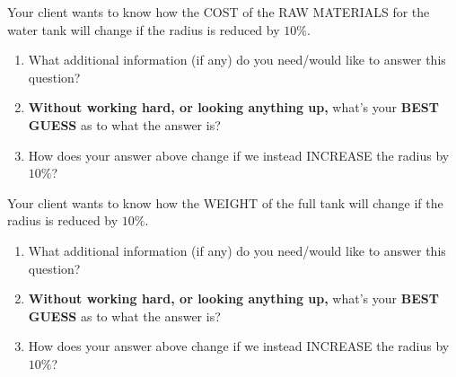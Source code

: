 \documentclass[handout,nooutcomes,noauthor]{ximera}
\begin{document}
\mynewpage


\begin{question} %
  Your client wants to know how the COST of the RAW MATERIALS for the
  water tank will change if the radius is reduced by $10\%$.
  \begin{enumerate}
  \item What additional information (if any) do you need/would like
    to answer this question?
  \item \textbf{Without working hard, or looking anything up,} what's
    your \textbf{BEST GUESS} as to what the answer is?
  \item How does your answer above change if we instead INCREASE the
    radius by $10\%$?
  \end{enumerate}
\end{question}

\mynewpage


\begin{question} %
  Your client wants to know how the WEIGHT of the full tank will
  change if the radius is reduced by $10\%$.
  \begin{enumerate}
  \item What additional information (if any) do you need/would like
    to answer this question?
  \item \textbf{Without working hard, or looking anything up,} what's
    your \textbf{BEST GUESS} as to what the answer is?
  \item How does your answer above change if we instead INCREASE the
    radius by $10\%$?
  \end{enumerate}
\end{question}



\end{document}
